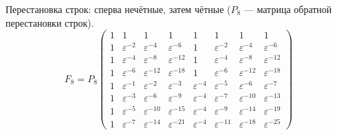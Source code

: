 Перестановка строк: сперва нечётные, затем чётные ($P_8$ --- матрица обратной перестановки строк).
\[
    F_8
    = P_8
    \begin{pmatrix}
        1 & 1                & 1                 & 1                 & 1                & 1                 & 1                 & 1                 \\
        1 & \varepsilon^{-2} & \varepsilon^{-4}  & \varepsilon^{-6}  & 1                & \varepsilon^{-2}  & \varepsilon^{-4}  & \varepsilon^{-6} \\
        1 & \varepsilon^{-4} & \varepsilon^{-8}  & \varepsilon^{-12} & 1                & \varepsilon^{-4}  & \varepsilon^{-8}  & \varepsilon^{-12} \\
        1 & \varepsilon^{-6} & \varepsilon^{-12} & \varepsilon^{-18} & 1                & \varepsilon^{-6}  & \varepsilon^{-12} & \varepsilon^{-18} \\
        1 & \varepsilon^{-1} & \varepsilon^{-2}  & \varepsilon^{-3}  & \varepsilon^{-4} & \varepsilon^{-5}  & \varepsilon^{-6}  & \varepsilon^{-7} \\
        1 & \varepsilon^{-3} & \varepsilon^{-6}  & \varepsilon^{-9}  & \varepsilon^{-4} & \varepsilon^{-7}  & \varepsilon^{-10} & \varepsilon^{-13} \\
        1 & \varepsilon^{-5} & \varepsilon^{-10} & \varepsilon^{-15} & \varepsilon^{-4} & \varepsilon^{-9}  & \varepsilon^{-14} & \varepsilon^{-19} \\
        1 & \varepsilon^{-7} & \varepsilon^{-14} & \varepsilon^{-21} & \varepsilon^{-4} & \varepsilon^{-11} & \varepsilon^{-18} & \varepsilon^{-25}
    \end{pmatrix}
\]

